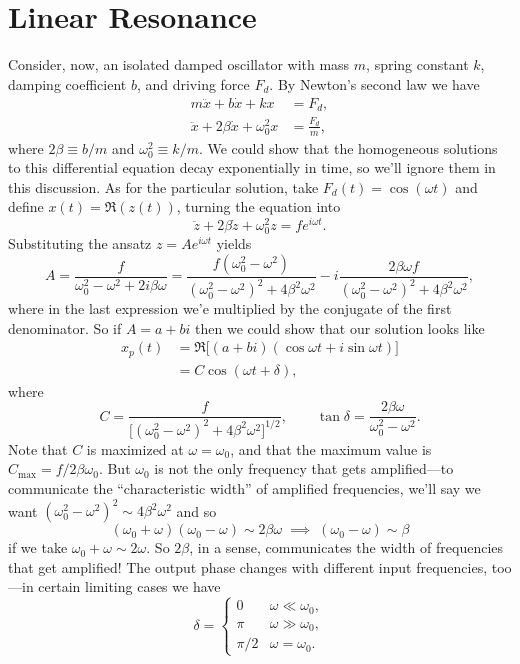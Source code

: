 \documentclass[../p111main.tex]{subfiles}
\begin{document}
\pagebreak

\section{Linear Resonance}
Consider, now, an isolated damped oscillator with mass $m$, spring constant $k$, damping coefficient $b$, and driving force $F_d$.
By Newton's second law we have
\begin{align*}
    m \ddot x + b \dot x + k x &= F_d, \\
    \ddot x + 2\beta \dot x + \omega_0^2 x &= \frac{F_d}{m},
\end{align*}
where $2\beta \equiv b / m$ and $\omega_0^2 \equiv k / m$.
We could show that the homogeneous solutions to this differential equation decay exponentially in time, so we'll ignore them in this discussion.
As for the particular solution, take $F_d(t) = \cos (\omega t)$ and define $x(t) = \Re (z(t))$, turning the equation into
\[ \ddot z + 2\beta \dot z + \omega_0^2 z = f e^{i\omega t}. \]
Substituting the ansatz $z = Ae^{i \omega t}$ yields
\[ A = \frac{f}{\omega_0^2 - \omega^2 + 2i \beta \omega} = \frac{f(\omega_0^2 - \omega^2)}{(\omega_0^2 - \omega^2)^2 + 4\beta^2 \omega^2} - i \frac{2\beta\omega f}{(\omega_0^2 - \omega^2)^2 + 4\beta^2 \omega^2}, \]
where in the last expression we'e multiplied by the conjugate of the first denominator.
So if $A = a + bi$ then we could show that our solution looks like
\begin{align*}
    x_p(t) &= \Re \big[ (a + bi)(\cos \omega t + i \sin \omega t) \big] \\
    &= C \cos (\omega t + \delta),
\end{align*}
where
\[ C = \frac{f}{\big[ (\omega_0^2 - \omega^2)^2 + 4\beta^2 \omega^2 \big]^{1 / 2}}, \qquad \tan \delta = \frac{2\beta \omega}{\omega_0^2 - \omega^2}. \]
Note that $C$ is maximized at $\omega = \omega_0$, and that the maximum value is $C_\textrm{max} = f / 2\beta \omega_0$.
But $\omega_0$ is not the only frequency that gets amplified---to communicate the ``characteristic width'' of amplified frequencies, we'll say we want $(\omega_0^2 - \omega^2)^2 \sim 4 \beta^2 \omega^2$ and so
\[ (\omega_0 + \omega)(\omega_0 - \omega) \sim 2\beta \omega \;\implies\; (\omega_0 - \omega) \sim \beta \]
if we take $\omega_0 + \omega \sim 2\omega$.
So $2\beta$, in a sense, communicates the width of frequencies that get amplified!
The output phase changes with different input frequencies, too---in certain limiting cases we have
\[ \delta = \begin{cases} 0 & \omega \ll \omega_0, \\ \pi & \omega \gg \omega_0, \\ \pi / 2 & \omega = \omega_0. \end{cases} \]
\end{document}

